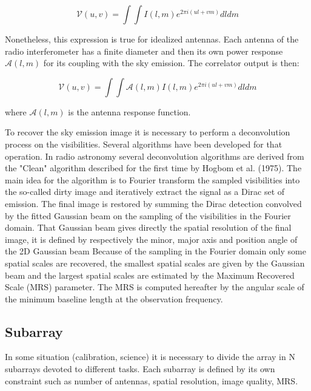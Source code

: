 \documentclass{aa}
\begin{document}
	\begin{equation}
	\mathcal{V}(u,v) =\int \int I(l,m)e^{2\pi i(ul+vm)}dldm
	\end{equation}
	
Nonetheless, this expression is true for idealized antennas. Each antenna of the radio interferometer has a finite diameter and then its own power response 
$\mathcal{A}(l,m)$ for its coupling with the sky emission. The correlator output is then:
	
	\begin{equation}
	\mathcal{V}(u,v) =\int \int \mathcal{A}(l,m)I(l,m)e^{2\pi i(ul+vm)}dldm
	\end{equation}
	
where $\mathcal{A}(l,m)$ is the antenna response function.
	
To recover the sky emission image it is necessary to perform a deconvolution process on the visibilities. Several algorithms have been developed  for that operation. In radio astronomy several deconvolution algorithms are derived from the "Clean" algorithm described for the first time by Hogbom et al. (1975). The main idea for the algorithm is to Fourier transform the sampled visibilities into the so-called dirty image and iteratively extract the signal as a Dirac set of emission. The final image is restored by summing the Dirac detection convolved by the fitted Gaussian beam on the sampling of the visibilities in the Fourier domain.
That Gaussian beam gives directly the spatial resolution of the final image, it is defined by respectively the minor, major axis and position angle of the 2D Gaussian beam
Because of the sampling in the Fourier domain only some spatial scales are recovered, the smallest spatial scales
are given by the Gaussian beam and the largest spatial scales are estimated by the Maximum Recovered Scale (MRS) parameter. The MRS is computed hereafter by the angular scale of the minimum baseline length at the observation frequency.

	
\subsection{Subarray}

In some situation (calibration, science) it is necessary to divide the array in N subarrays devoted to different
tasks. Each subarray is defined by its own constraint such as number of antennas, spatial resolution, image quality, MRS.

\end{document}
